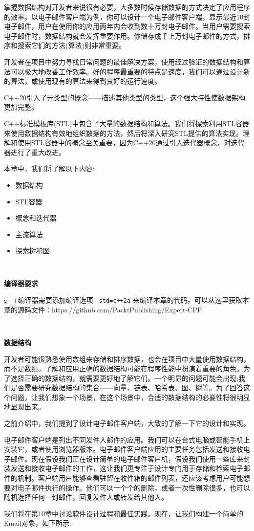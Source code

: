 掌握数据结构对开发者来说很有必要，大多数时候存储数据的方式决定了应用程序的效率。以电子邮件客户端为例，你可以设计一个电子邮件客户端，显示最近10封电子邮件，用户在使用你的应用两年内会收到数十万封电子邮件。当用户需要搜索电子邮件时，数据结构就会发挥重要作用。你储存成千上万封电子邮件的方式，排序和搜索它们的方法(算法)则非常重要。 \par
开发者在项目中努力寻找日常问题的最佳解决方案，使用经过验证的数据结构和算法可以极大地改善工作效率。好的程序最重要的特点是速度，我们可以通过设计新的算法，或使用现有的算法来得到良好的运行速度。 \par
C++20引入了元类型的概念——描述其他类型的类型，这个强大特性使数据架构更加完整。 \par
C++标准模板库(STL)中包含了大量的数据结构和算法。我们将探索利用STL容器来使用数据结构有效地组织数据的方法，然后将深入研究STL提供的算法实现。理解和使用STL容器中的概念至关重要，因为C++20通过引入迭代器概念，对迭代器进行了重大改进。 \par
本章中，我们将了解以下内容: \par

\begin{itemize}
	\item 数据结构
	\item STL容器
	\item 概念和迭代器
	\item 主流算法
	\item 探索树和图
\end{itemize}

\noindent\textbf{}\ \par
\textbf{编译器要求} \ \par
g++编译器需要添加编译选项 \texttt{-std=c++2a} 来编译本章的代码。可以从这里获取本章的源码文件：https:/​/github.​com/PacktPublishing/Expert-CPP \par

\noindent\textbf{}\ \par
\textbf{数据结构} \ \par
开发者可能很熟悉使用数组来存储和排序数据，也会在项目中大量使用数据结构，而不是数组。了解和应用正确的数据结构可能在程序性能中扮演着重要的角色。为了选择正确的数据结构，就需要更好地了解它们。一个明显的问题可能会出现:我们是否需要研究数据结构的集合——向量、链表、哈希表、图、树等。为了回答这个问题，让我们想象一个场景，在这个场景中，合适的数据结构的必要性将很明显地显现出来。 \par
之前介绍中，我们提到了设计电子邮件客户端，大致的了解一下它的设计和实现。 \par
电子邮件客户端是列出不同发件人邮件的应用。我们可以在台式电脑或智能手机上安装它，或者使用浏览器版本。电子邮件客户端应用的主要任务包括发送和接收电子邮件。现在假设我们正在设计简单的电子邮件客户机，假设我们使用一些库来封装发送和接收电子邮件的工作，这让我们更专注于设计专门用于存储和检索电子邮件的机制。客户端用户能够查看驻留在收件箱的邮件列表，还应该考虑用户可能想要对电子邮件执行的操作。他们可以一个个的删除，或者一次性删除很多，也可以随机选择任何一封邮件，回复发件人或转发给其他人。 \par
我们将在第10章中讨论软件设计过程和最佳实践。现在，让我们构建一个简单的Email对象，如下所示: \par

